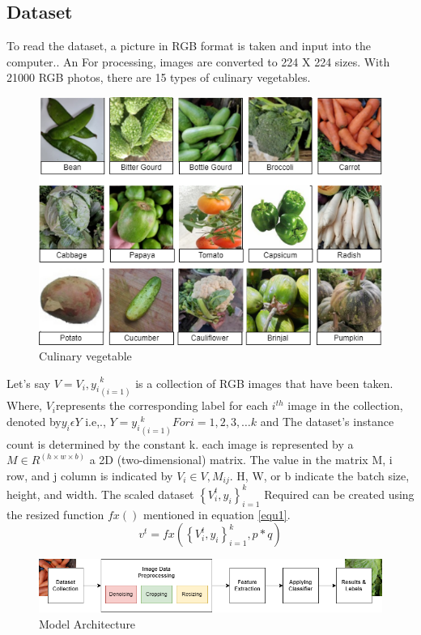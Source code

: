 \documentclass[a4paper,fleqn]{cas-sc}
\begin{document}
\subsection{Dataset}
To read the dataset, a picture in RGB format is taken and input into the computer.. An For processing, images are converted to 224 X 224 sizes. With 21000 RGB photos, there are 15 types of culinary vegetables.

\begin{figure}[!ht]
\includegraphics[width=\textwidth]{pic culinary vegetable}
\caption{Culinary vegetable }
\label{}
\end{figure}

Let’s say  $V={V_i, y_i }_(i=1)^k$ is a collection of RGB images that have been taken. Where, $V_i $represents the corresponding label for each $ i^{th} $  image in the collection, denoted by$ y_{i} \epsilon Y$ i.e,., $Y ={ y_i }_(i=1)^k For i={1,2,3,\dots k}$ and The dataset's instance count is determined by the constant k. each image is represented by a $M \in R^{(h×w×b)}$ a 2D (two-dimensional) matrix. The value in the matrix M, i row, and j column is indicated by $V_i \in V, M_{ij}$. H, W, or b indicate the batch size, height, and width. The scaled dataset  $\left\{V_i^t,y_i \right\}_{i=1}^k$  Required can be created using the resized function $fx()$ mentioned in equation \ref{equ1}.
\begin{equation} \label{equ1}
v^t=fx(\left\{V_i^t,y_i \right\}_{i=1}^k , p*q)
\end{equation}

\begin{figure}
\includegraphics[width=\textwidth]{pic}
\caption{Model Architecture }
\label{}
\end{figure}
\end{document}
